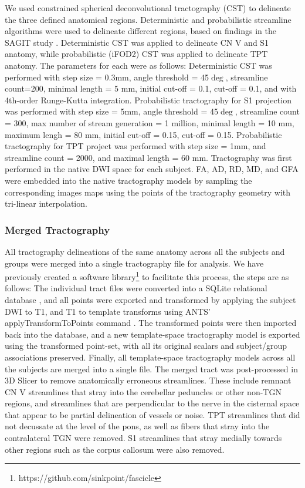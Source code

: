We used constrained spherical deconvolutional tractography (CST) \cite{Tournier2012b} to delineate the three defined anatomical regions. Deterministic and probabilistic streamline algorithms were used to delineate different regions, based on findings in the SAGIT study \cite{Chen2016}. Deterministic CST was applied to delineate CN V and S1 anatomy, while probabilistic (iFOD2) CST \cite{Jeurissen2011b,Tournier2010} was applied to delineate TPT anatomy. The parameters for each were as follows: Deterministic CST was performed with step size = 0.3mm, angle threshold = 45$\deg$, streamline count=200, minimal length = 5 mm, initial cut-off = 0.1, cut-off = 0.1, and with 4th-order Runge-Kutta integration. Probabilistic tractography for S1 projection was performed with step size = 5mm, angle threshold = 45$\deg$, streamline count = 300, max number of stream generation = 1 million, minimal length = 10 mm, maximum lengh = 80 mm, initial cut-off = 0.15, cut-off = 0.15. Probabilistic tractography for TPT project was performed with step size = 1mm, and streamline count = 2000, and maximal length = 60 mm. Tractography was first performed in the native DWI space for each subject.  FA, AD, RD, MD, and GFA were embedded into the native tractography models by sampling the corresponding images maps using the points of the tractography geometry with tri-linear interpolation.

\subsubsection{Merged Tractography}
All tractography delineations of the same anatomy across all the subjects and groups were merged into a single tractography file for analysis. We have previously created a software library\footnote{https://github.com/sinkpoint/fascicle} to facilitate this process, the steps are as follows: The individual tract files were converted into a SQLite relational database \cite{owens2010sqlite}, and  all points were exported and transformed by applying the subject DWI to T1, and T1 to template transforms using ANTS' applyTransformToPoints command \cite{Avants2009}. The transformed points were then imported back into the  database, and a new template-space tractography model is exported using the transformed point-set, with all its original scalars and subject/group associations preserved. Finally, all template-space tractography models across all the subjects are merged into a single file. 
The merged tract was post-processed in 3D Slicer to remove anatomically erroneous streamlines. These include remnant CN V streamlines that stray into the cerebellar peduncles or other non-TGN regions, and streamlines that are perpendicular to the nerve in the cisternal space that appear to be partial delineation of vessels or noise. TPT streamlines that did not decussate at the level of the pons, as well as fibers that stray into the contralateral TGN were removed. S1 streamlines that stray medially towards other regions such as the corpus callosum were also removed.

